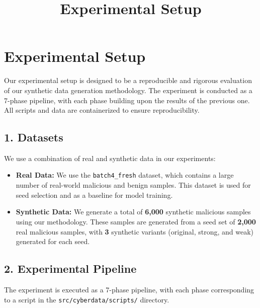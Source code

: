 \documentclass{article}
\title{Experimental Setup}
\author{}
\date{}
\begin{document}
\maketitle

\section*{Experimental Setup}

Our experimental setup is designed to be a reproducible and rigorous evaluation of our synthetic data generation methodology. The experiment is conducted as a 7-phase pipeline, with each phase building upon the results of the previous one. All scripts and data are containerized to ensure reproducibility.

\subsection*{1. Datasets}

We use a combination of real and synthetic data in our experiments:

\begin{itemize}
    \item \textbf{Real Data:} We use the \texttt{batch4_fresh} dataset, which contains a large number of real-world malicious and benign samples. This dataset is used for seed selection and as a baseline for model training.
    \item \textbf{Synthetic Data:} We generate a total of \textbf{6,000} synthetic malicious samples using our methodology. These samples are generated from a seed set of \textbf{2,000} real malicious samples, with \textbf{3} synthetic variants (original, strong, and weak) generated for each seed.
\end{itemize}

\subsection*{2. Experimental Pipeline}

The experiment is executed as a 7-phase pipeline, with each phase corresponding to a script in the \texttt{src/cyberdata/scripts/} directory.
\end{document}

